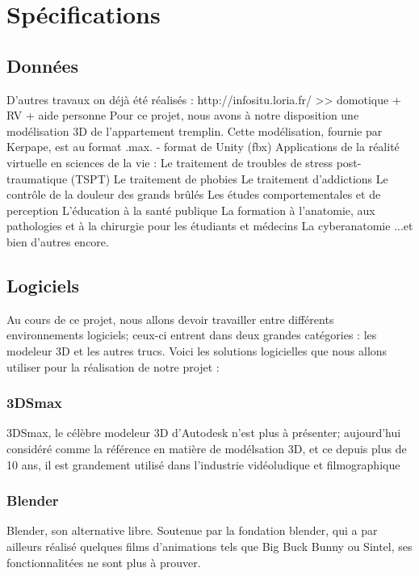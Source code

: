 ﻿\section{Sp\'ecifications}

\subsection{Données}
	D'autres travaux on déjà été réalisés : http://infositu.loria.fr/ >> domotique + RV + aide personne
	Pour ce projet, nous avons à notre disposition une modélisation 3D de l'appartement tremplin. Cette modélisation, fournie par Kerpape, est au format .max.
	- format de Unity (fbx)
	Applications de la réalité virtuelle en sciences de la vie :
	Le traitement de troubles de stress post-traumatique (TSPT)
	Le traitement de phobies
	Le traitement d'addictions
	Le contrôle de la douleur des grands brûlés
	Les études comportementales et de perception
	L'éducation à la santé publique
	La formation à l'anatomie, aux pathologies et à la chirurgie pour les étudiants et médecins
	La cyberanatomie
	...et bien d'autres encore.

\subsection{Logiciels}
	Au cours de ce projet, nous allons devoir travailler entre différents environnements logiciels; ceux-ci entrent dans deux grandes catégories : les modeleur 3D et les autres trucs.
	Voici les solutions logicielles que nous allons utiliser pour la réalisation de notre projet :
	
	\subsubsection{3DSmax}
		3DSmax, le célèbre modeleur 3D d’Autodesk n’est plus à présenter; aujourd’hui considéré comme la référence en matière de modélsation 3D, et ce depuis plus de 10 ans, il est grandement utilisé dans l’industrie vidéoludique et filmographique
	
	\subsubsection{Blender} 
		Blender, son alternative libre. Soutenue par la fondation blender, qui a par ailleurs réalisé quelques films d’animations tels que Big Buck Bunny ou Sintel, ses fonctionnalitées ne sont plus à prouver.
	
